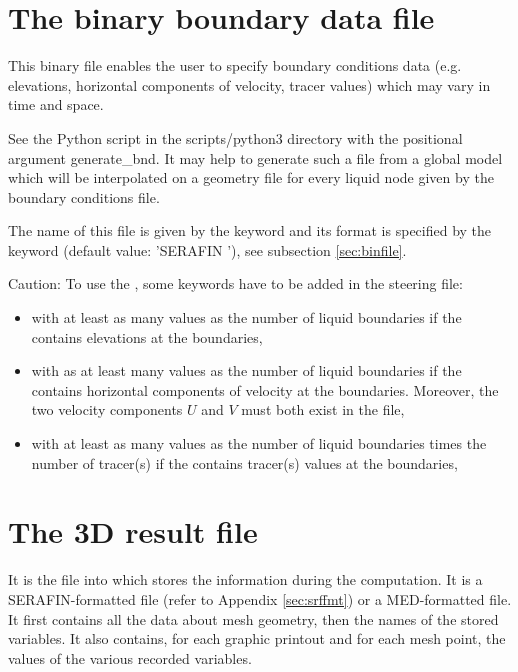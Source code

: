 \section{The binary boundary data file}

This binary file enables the user to specify boundary conditions data (e.g.
elevations, horizontal components of velocity, tracer values) which
may vary in time and space.

See the Python script  in the scripts/python3 directory
with the positional argument generate\_bnd.
It may help to generate such a file from a global model which will be
interpolated on a geometry file for every liquid node given by the boundary
conditions file.

The name of this file is given by the keyword 
and its format is specified by the keyword
 (default value: 'SERAFIN '),
see subsection \ref{sec:binfile}.

\begin{WarningBlock}{Caution:}
To use the , some keywords have to be added
in the steering file:
\begin{itemize}
\item {} with at least as many values as the
number of liquid boundaries if the  contains
elevations at the boundaries,
\item {} with as at least many values as the
number of liquid boundaries if the  contains
horizontal components of velocity at the boundaries.
Moreover, the two velocity components $U$ and $V$ must both exist in the file,
\item {} with at least as many values as the
number of liquid boundaries times the number of tracer(s) if the
 contains tracer(s) values at the boundaries,
\end{itemize}
\end{WarningBlock}


\section{The 3D result file}
\label{sec:3dres}
It is the file into which  stores the information during the
computation. It is a SERAFIN-formatted file (refer to Appendix
\ref{sec:srffmt}) or a MED-formatted file. It first contains all the data about
mesh geometry, then the names of the stored variables. It also contains, for
each graphic printout and for each mesh point, the values of the various
recorded variables.

